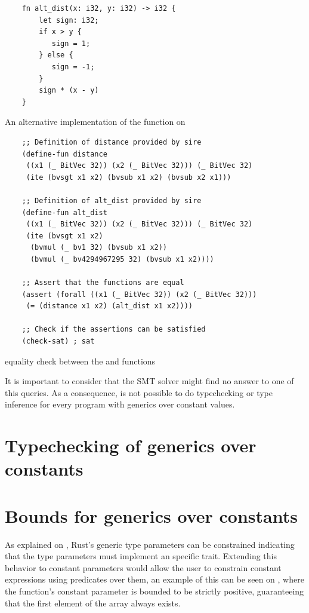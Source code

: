 \begin{listing}[h]
    \begin{verbatim}
    fn alt_dist(x: i32, y: i32) -> i32 {
        let sign: i32; 
        if x > y {
           sign = 1;
        } else {
           sign = -1;
        }
        sign * (x - y)
    }
    \end{verbatim}
    \caption{An alternative implementation of the  function on }
  \label{lst:alt_distance}
\end{listing}

\begin{listing}[h]
    \begin{verbatim}
    ;; Definition of distance provided by sire
    (define-fun distance 
     ((x1 (_ BitVec 32)) (x2 (_ BitVec 32))) (_ BitVec 32) 
     (ite (bvsgt x1 x2) (bvsub x1 x2) (bvsub x2 x1)))

    ;; Definition of alt_dist provided by sire
    (define-fun alt_dist 
     ((x1 (_ BitVec 32)) (x2 (_ BitVec 32))) (_ BitVec 32) 
     (ite (bvsgt x1 x2) 
      (bvmul (_ bv1 32) (bvsub x1 x2)) 
      (bvmul (_ bv4294967295 32) (bvsub x1 x2))))
    
    ;; Assert that the functions are equal
    (assert (forall ((x1 (_ BitVec 32)) (x2 (_ BitVec 32))) 
     (= (distance x1 x2) (alt_dist x1 x2)))) 

    ;; Check if the assertions can be satisfied
    (check-sat) ; sat
    \end{verbatim}
    \caption{equality check between the  and  functions}
  \label{lst:func_equality}
\end{listing}

It is important to consider that the SMT solver might find no answer to one of
this queries. As a consequence, is not possible to do typechecking or type
inference for every program with generics over constant values.

\section{Typechecking of generics over constants}

\section{Bounds for generics over constants}

As explained on , Rust's generic type parameters can be
constrained indicating that the type parameters must implement an specific
trait. Extending this behavior to constant parameters would allow the user to
constrain constant expressions using predicates over them, an example of this
can be seen on , where the 
function's constant parameter  is bounded to be strictly positive,
guaranteeing that the first element of the array always exists. 


